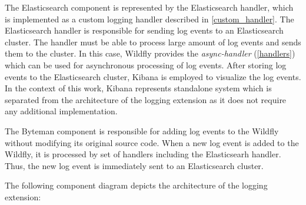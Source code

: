 \documentclass[12pt,oneside]{fithesis2}
\begin{document}
The Elasticsearch component is represented by the  Elasticsearch handler, which is implemented as a custom logging handler described in \ref{custom_handler}. The Elasticsearch handler is responsible for sending log events to an Elasticsearch cluster. The handler must be able to process large amount of log events and sends them to the cluster. In this case, Wildfly provides the \textit{async-handler} (\ref{handlers}) which can be used for asynchronous processing of log events. After storing log events to the Elasticsearch cluster, Kibana is employed to visualize the log events. In the context of this work, Kibana represents standalone system which is separated from the architecture of the logging extension as it does not require any additional implementation.

The Byteman component is responsible for adding log events to the Wildfly without modifying its original source code. When a new log event is added to the Wildfly, it is processed by set of handlers including the Elasticsearh handler. Thus, the new log event is immediately sent to an Elasticsearch cluster.

The following component diagram depicts the architecture of the logging extension:





\end{document}
